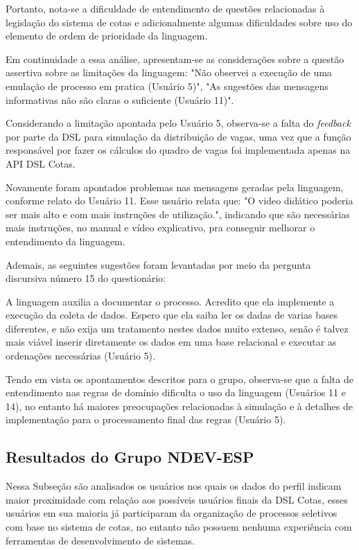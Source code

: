 Portanto, nota-se a dificuldade de entendimento de questões relacionadas à legislação do sistema de cotas e adicionalmente algumas dificuldades sobre uso do elemento de ordem de prioridade da linguagem. 

Em continuidade a essa análise, apresentam-se as considerações sobre a questão assertiva sobre as limitações da linguagem: "Não observei a execução de uma emulação de processo em pratica (Usuário 5)", "As sugestões das mensagens informativas não são claras o suficiente (Usuário 11)".

Considerando a limitação apontada pelo Usuário 5, observa-se a falta do \textit{feedback} por parte da DSL para simulação da distribuição de vagas, uma vez que a função responsável por fazer os cálculos do quadro de vagas foi implementada apenas na API DSL Cotas. 

Novamente foram apontados problemas nas mensagens geradas pela linguagem, conforme relato do Usuário 11. Esse usuário relata que: "O video didático poderia ser mais alto e com mais instruções de utilização.", indicando que são necessárias mais instruções, no manual e vídeo explicativo, pra conseguir melhorar o entendimento da linguagem. 

Ademais, as seguintes sugestões foram levantadas por meio da pergunta discursiva número 15 do questionário:

\begin{citacao}
A linguagem auxilia a documentar o processo. Acredito que ela implemente a execução da coleta de dados. Espero que ela saiba ler os dadas de varias bases diferentes, e não exija um tratamento nestes dados muito extenso, senão é talvez mais viável inserir diretamente os dados em uma base relacional e executar as ordenações necessárias (Usuário 5).
\end{citacao}

\newpage
Tendo em vista os apontamentos descritos para o grupo, observa-se que a falta de entendimento nas regras de domínio dificulta o uso da linguagem (Usuários 11 e 14), no entanto há maiores preocupações relacionadas à simulação e à detalhes de implementação para o processamento final das regras (Usuário 5).

\newpage
\subsection{Resultados do Grupo NDEV-ESP}
\label{subsec:ndevesp}

Nessa Subseção são analisados os usuários nos quais os dados do perfil indicam maior proximidade com relação aos possíveis usuários finais da DSL Cotas, esses usuários em sua maioria já participaram da organização de processos seletivos com base no sistema de cotas, no entanto não possuem nenhuma experiência com ferramentas de desenvolvimento de sistemas.

